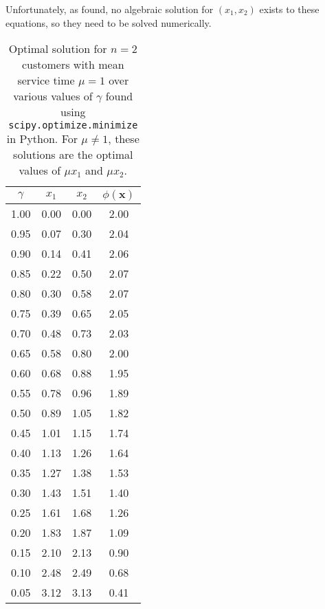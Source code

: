 Unfortunately, as \citet{Pegden} found, no algebraic solution for $(x_{1}, x_{2})$ exists to these equations, so they need to be solved numerically.

\begin{table}[htb]
\centering
\begin{tabular}{|c|c|c|c|} \hline
 $\gamma$ &  $x_{1}$ &  $x_{2}$ &  $\phi (\mathbf{x})$ \\ \hline
     1.00 &     0.00 &     0.00 &                 2.00 \\
     0.95 &     0.07 &     0.30 &                 2.04 \\
     0.90 &     0.14 &     0.41 &                 2.06 \\
     0.85 &     0.22 &     0.50 &                 2.07 \\
     0.80 &     0.30 &     0.58 &                 2.07 \\
     0.75 &     0.39 &     0.65 &                 2.05 \\
     0.70 &     0.48 &     0.73 &                 2.03 \\
     0.65 &     0.58 &     0.80 &                 2.00 \\
     0.60 &     0.68 &     0.88 &                 1.95 \\
     0.55 &     0.78 &     0.96 &                 1.89 \\
     0.50 &     0.89 &     1.05 &                 1.82 \\
     0.45 &     1.01 &     1.15 &                 1.74 \\
     0.40 &     1.13 &     1.26 &                 1.64 \\
     0.35 &     1.27 &     1.38 &                 1.53 \\
     0.30 &     1.43 &     1.51 &                 1.40 \\
     0.25 &     1.61 &     1.68 &                 1.26 \\
     0.20 &     1.83 &     1.87 &                 1.09 \\
     0.15 &     2.10 &     2.13 &                 0.90 \\
     0.10 &     2.48 &     2.49 &                 0.68 \\
     0.05 &     3.12 &     3.13 &                 0.41 \\ \hline
\end{tabular}
\caption{Optimal solution for $n = 2$ customers with mean service time $\mu = 1$ over various values of $\gamma$ found using \texttt{scipy.optimize.minimize} in Python. For $\mu \neq 1$, these solutions are the optimal values of $\mu x_{1}$ and $\mu x_{2}$.}
\end{table}













































